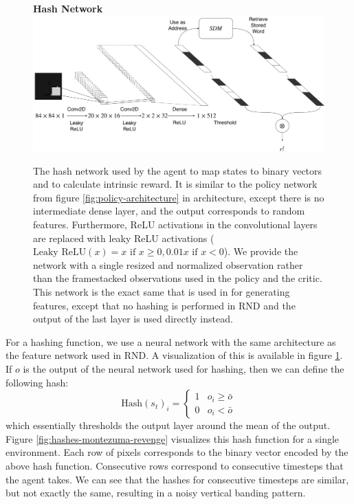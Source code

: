 \documentclass[journal, onecolumn, 12pt, draftclsnofoot]{IEEEtran}
\begin{document}
	\begin{figure}
		\begin{center}
			\textbf{Hash Network}\\
		\includegraphics[scale=0.3]{fig/hash-network.pdf}
		\end{center}
		\caption{The hash network used by the agent to map states to binary vectors and to calculate intrinsic reward. It is similar to the policy network from figure \ref{fig:policy-architecture} in architecture, except there is no intermediate dense layer, and the output corresponds to random features. Furthermore, ReLU activations in the convolutional layers are replaced with leaky ReLU activations ($\text{Leaky ReLU}(x) = x \text{ if } x\geq0, 0.01x \text{ if } x<0$). We provide the network with a single resized and normalized observation rather than the framestacked observations used in the policy and the critic. This network is the exact same that is used in \cite{rnd} for generating features, except that no hashing is performed in RND and the output of the last layer is used directly instead.}
		\label{fig:nn-hash}
	\end{figure}
	\par For a hashing function, we use a neural network with the same architecture as the feature network used in RND. A visualization of this is available in figure \ref{fig:nn-hash}. If $o$ is the output of the neural network used for hashing, then we can define the following hash:
	\begin{equation}
		\label{eqn:hash-mean}
		\text{Hash}(s_t)_i = \begin{cases}
												1 & o_i \geq \bar{o} \\
												0 & o_i < \bar{o}
												\end{cases}
	\end{equation}
	which essentially thresholds the output layer around the mean of the output. Figure \ref{fig:hashes-montezuma-revenge} visualizes this hash function for a single environment. Each row of pixels corresponds to the binary vector encoded by the above hash function. Consecutive rows correspond to consecutive timesteps that the agent takes. We can see that the hashes for consecutive timesteps are similar, but not exactly the same, resulting in a noisy vertical banding pattern.
\end{document}
